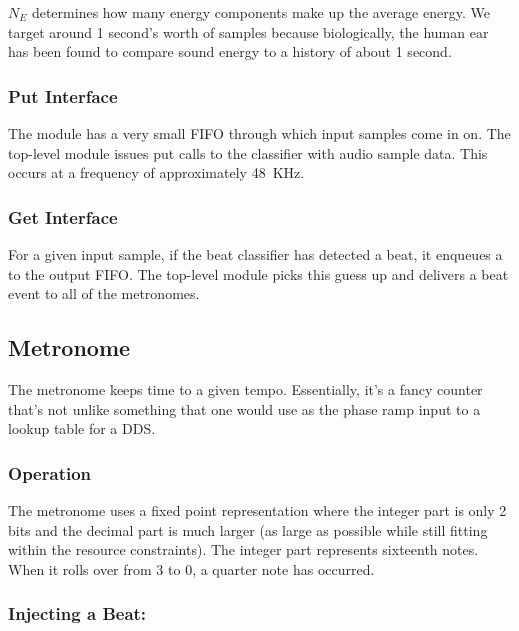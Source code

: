 \documentclass[letterpaper]{article}
\begin{document}
        $N_E$ determines how many energy components make up the average energy.
        We target around 1 second's worth of samples because biologically, the
        human ear has been found to compare sound energy to a history of about
        1 second.


        \subsubsection{Put Interface}

        The module has a very small FIFO through which input samples come in
        on.  The top-level module issues put calls to the classifier with
        audio sample data.  This occurs at a frequency of approximately 48~KHz.
            

        \subsubsection{Get Interface}
        \label{sec:bc:metif}

        For a given input sample, if the beat classifier has detected a beat,
        it enqueues a  to the output FIFO.  The top-level module
        picks this guess up and delivers a beat event to all of the metronomes.

        
    \subsection{Metronome}

        The metronome keeps time to a given tempo.  Essentially, it's a fancy
        counter that's not unlike something that one would use as the phase ramp
        input to a lookup table for a DDS.

        \subsubsection{Operation}

        The metronome uses a fixed point representation where the integer part is
        only 2 bits and the decimal part is much larger (as large as possible while
        still fitting within the resource constraints).  The integer part
        represents sixteenth notes.  When it rolls over from 3 to 0, a quarter note
        has occurred.

        \subsubsection{Injecting a Beat: }
        
\end{document}
